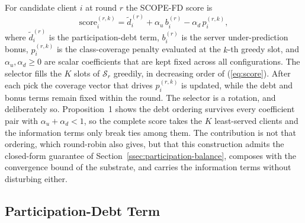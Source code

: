 \documentclass[journal]{IEEEtran}
\newcommand{\rev}[1]{#1}
\begin{document}
For candidate client $i$ at round $r$ the SCOPE-FD score is
\begin{equation}
\text{score}_i^{(r,k)} = \tilde{d}_i^{(r)} + \alpha_u\, b_i^{(r)} - \alpha_d\, p_i^{(r,k)},
\label{eq:score}
\end{equation}
where $\tilde{d}_i^{(r)}$ is the participation-debt term, $b_i^{(r)}$ is the server under-prediction bonus, $p_i^{(r,k)}$ is the class-coverage penalty evaluated at the $k$-th greedy slot, and $\alpha_u, \alpha_d \ge 0$ are scalar coefficients that are kept fixed across all configurations. The selector fills the $K$ slots of $\mathcal{S}_r$ greedily, in decreasing order of (\ref{eq:score}). After each pick the coverage vector that drives $p_i^{(r,k)}$ is updated, while the debt and bonus terms remain fixed within the round. \rev{The selector is a rotation, and deliberately so. Proposition~1 shows the debt ordering survives every coefficient pair with $\alpha_u + \alpha_d < 1$, so the complete score takes the $K$ least-served clients and the information terms only break ties among them. The contribution is not that ordering, which round-robin also gives, but that this construction admits the closed-form guarantee of Section~\ref{ssec:participation-balance}, composes with the convergence bound of the substrate, and carries the information terms without disturbing either.}

\subsection{Participation-Debt Term}
\label{ssec:debt-term}
\end{document}
